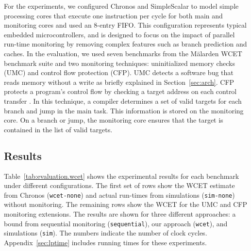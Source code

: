 
For the experiments, we configured Chronos and SimpleScalar to model simple processing cores
that execute one instruction per cycle for both main and monitoring cores and used an 8-entry FIFO.
This configuration represents typical embedded microcontrollers, and is designed to focus on 
the impact of parallel run-time monitoring by removing complex features such as branch prediction 
and caches.
In the evaluation, we used seven benchmarks from the M\"alarden WCET benchmark suite \cite{malarden} 
and two monitoring techniques: uninitialized memory checks (UMC) and control flow protection (CFP).
UMC detects a software bug that reads memory without a write as briefly explained in 
Section~\ref{sec:arch}. CFP protects a program's control flow by checking a target address on
each control transfer \cite{arora-runtime05}. In this technique, a compiler determines a set of valid
targets for each branch and jump in the main task.
This information is stored on the monitoring core. 
On a branch or jump, the monitoring core ensures that the target is
contained in the list of valid targets.


\vspace{-0.05in}
\subsection{Results}

Table~\ref{tab:evaluation.wcet} shows the experimental results for each
benchmark under different configurations. The first set of rows show the WCET 
estimate from Chronos ({\tt wcet-none}) and actual run-times from simulations ({\tt sim-none}) without 
monitoring. The remaining rows show the WCET for the UMC and
CFP monitoring extensions. The results are shown for three different approaches:
a bound from sequential monitoring ({\tt sequential}), our approach ({\tt wcet}),
and simulations ({\tt sim}). The numbers indicate the number of clock cycles.
Appendix~\ref{sec:lptime} includes running times for these experiments.

